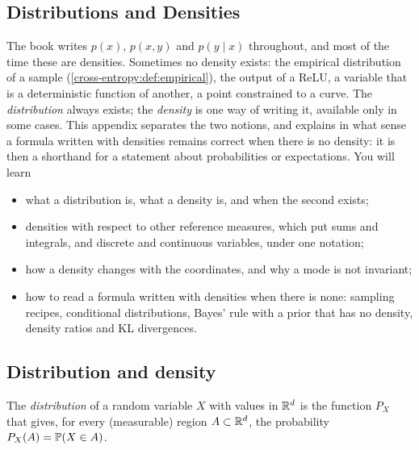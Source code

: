 \begin{notechapter}
\chapter{Distributions and Densities}\label{ch:distributions-densities}

\begin{chapterintro}
The book writes $p(x)$, $p(x, y)$ and $p(y\mid x)$ throughout, and most of the time these are densities.
Sometimes no density exists: the empirical distribution of a sample (\cref{cross-entropy:def:empirical}),
the output of a ReLU, a variable that is a deterministic function of another, a point constrained to a
curve. The \emph{distribution} always exists; the \emph{density} is one way of writing it, available only
in some cases. This appendix separates the two notions, and explains in what sense a formula written
with densities remains correct when there is no density: it is then a shorthand for a statement about
probabilities or expectations. You will learn
\begin{itemize}[nosep]
  \item what a distribution is, what a density is, and when the second exists;
  \item densities with respect to other reference measures, which put sums and integrals, and discrete
        and continuous variables, under one notation;
  \item how a density changes with the coordinates, and why a mode is not invariant;
  \item how to read a formula written with densities when there is none: sampling recipes, conditional
        distributions, Bayes' rule with a prior that has no density, density ratios and KL divergences.
\end{itemize}
\end{chapterintro}

\section{Distribution and density}\label{distributions-densities:sec:basics}

\begin{definition}[Distribution]\label{distributions-densities:def:distribution}
The \emph{distribution} of a random variable $X$ with values in $\mathbb{R}^d$ is the function $P_X$ that gives,
for every (measurable) region $A\subset\mathbb{R}^d$, the probability $P_X(A) = \mathbb{P}(X\in A)$.
\end{definition}


\end{notechapter}
